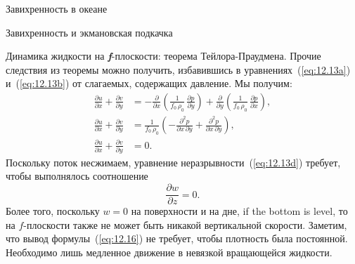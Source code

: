 \begin{chapter}{Завихренность в океане}
\begin{section}{Завихренность и экмановская подкачка}
\begin{paragraph}{Динамика жидкости на \textbf{\textit{f}}-плоскости: 
теорема Тейлора-Праудмена.}
Прочие следствия из теоремы можно получить, избавившись в 
уравнениях~(\ref{eq:12.13a}) и~(\ref{eq:12.13b}) от слагаемых,
содержащих давление. Мы получим:
\begin{subequations}
\begin{align}
\frac{\partial{u}}{\partial{x}} + \frac{\partial{v}}{\partial{y}} 
  &= -\frac{\partial }{\partial{x}} \left(\frac{1}{f_{0}\,\rho_{0}}\,
       \frac{\partial{p}}{\partial{y}} \right) 
     + \frac{\partial }{\partial{y}} \left(\frac{1}{f_{0}\,\rho_{0}}\,
       \frac{\partial{p}}{\partial{x}} \right), \label{eq:12.15a}\\
\frac{\partial{u}}{\partial{x}} + \frac{\partial{v}}{\partial{y}} 
  &= \frac{1}{f_{0}\,\rho_{0}} 
       \left( -\frac{\partial ^2 p}{\partial{x}\,\partial{y}} 
              + \frac{\partial ^2 p}{\partial{x}\,\partial{y}} \right),  \label{eq:12.15b}\\
\frac{\partial{u}}{\partial{x}} + \frac{\partial{v}}{\partial{y}} 
  &= 0.\label{eq:12.15c}
\end{align}
\end{subequations}
Поскольку поток несжимаем, уравнение неразрывности~(\ref{eq:12.13d}) требует,
чтобы выполнялось соотношение
\begin{equation}\label{eq:12.16}
 \frac{\partial{w}}{\partial{z}} = 0.
\end{equation}
Более того, поскольку $w = 0$ на поверхности и на дне, if the bottom is level, 
то на $f$-плоскости также не может 
быть никакой вертикальной скорости. Заметим, что вывод 
формулы~(\ref{eq:12.16}) не требует, чтобы плотность была постоянной. 
Необходимо лишь медленное движение в невязкой вращающейся жидкости.
%

\end{paragraph}
\end{section}
\end{chapter}
